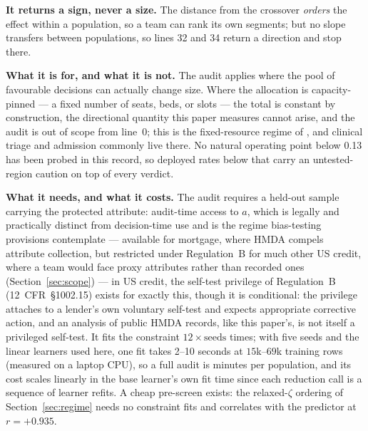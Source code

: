 \documentclass[conference]{IEEEtran}
\begin{document}
\textbf{It returns a sign, never a size.} The distance from the crossover \emph{orders} the
effect within a population, so a team can rank its own segments; but no slope transfers between
populations, so lines 32 and 34 return a direction and stop there.

\textbf{What it is for, and what it is not.} The audit applies where the pool of
favourable decisions can actually change size. Where the allocation is
capacity-pinned --- a fixed number of seats, beds, or slots --- the total is constant
by construction, the directional quantity this paper measures cannot arise, and the
audit is out of scope from line~0; this is the fixed-resource regime of
\cite{goethals2024}, and clinical triage and admission commonly live there. No
natural operating point below 0.13 has been probed in this record, so deployed rates
below that carry an untested-region caution on top of every verdict.

\textbf{What it needs, and what it costs.} The audit requires a held-out sample carrying
the protected attribute: audit-time access to $a$, which is legally and practically distinct from decision-time use and is the regime bias-testing provisions contemplate --- available for mortgage, where HMDA compels attribute collection, but restricted under Regulation~B for much other US credit, where a team would face proxy attributes rather than recorded ones (Section~\ref{sec:scope}) --- in US credit, the self-test privilege of Regulation~B
(12~CFR~\S1002.15) exists for exactly this, though it is conditional: the privilege
attaches to a lender's own voluntary self-test and expects appropriate corrective
action, and an analysis of public HMDA records, like this paper's, is not itself a
privileged self-test. It fits the constraint $12 \times \mathrm{seeds}$ times; with five seeds
and the linear learners used here, one fit takes 2--10 seconds at $15$k--$69$k training
rows (measured on a laptop CPU), so a full audit is minutes per population, and its cost
scales linearly in the base learner's own fit time since each reduction call is a
sequence of learner refits. A cheap pre-screen exists: the relaxed-$\zeta$ ordering of
Section~\ref{sec:regime} needs no constraint fits and correlates with the predictor at
$r=+0.935$.
\end{document}
